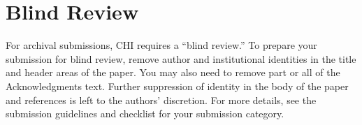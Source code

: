 \section{Blind Review}

For archival submissions, CHI requires a ``blind review.'' To prepare
                                your submission for blind review, remove author and institutional
                                identities in the title and header areas of the paper. You may also
                                need to remove part or all of the Acknowledgments text.  Further
                                suppression of identity in the body of the paper and references is
                                left to the authors' discretion. For more details, see the submission
                                guidelines and checklist for your submission category.